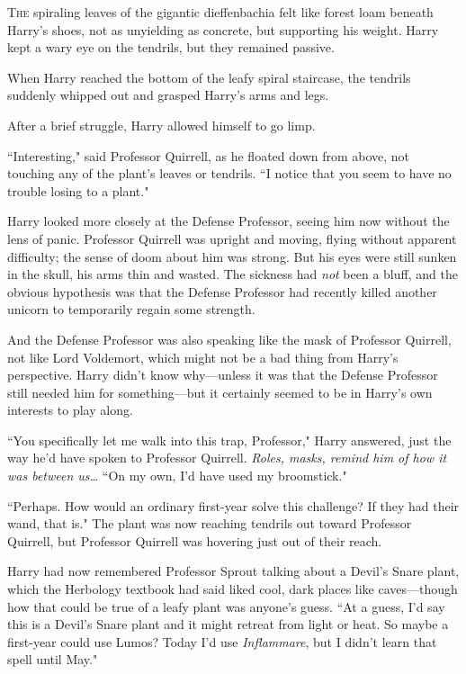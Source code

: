 
\lettrine{T}{he} spiraling leaves of the gigantic dieffenbachia felt like forest loam beneath Harry's shoes, not as unyielding as concrete, but supporting his weight. Harry kept a wary eye on the tendrils, but they remained passive.

When Harry reached the bottom of the leafy spiral staircase, the tendrils suddenly whipped out and grasped Harry's arms and legs.

After a brief struggle, Harry allowed himself to go limp.

``Interesting," said Professor Quirrell, as he floated down from above, not touching any of the plant's leaves or tendrils. ``I notice that you seem to have no trouble losing to a plant."

Harry looked more closely at the Defense Professor, seeing him now without the lens of panic. Professor Quirrell was upright and moving, flying without apparent difficulty; the sense of doom about him was strong. But his eyes were still sunken in the skull, his arms thin and wasted. The sickness had \emph{not} been a bluff, and the obvious hypothesis was that the Defense Professor had recently killed another unicorn to temporarily regain some strength.

And the Defense Professor was also speaking like the mask of Professor Quirrell, not like Lord Voldemort, which might not be a bad thing from Harry's perspective. Harry didn't know why—unless it was that the Defense Professor still needed him for something—but it certainly seemed to be in Harry's own interests to play along.

``You specifically let me walk into this trap, Professor," Harry answered, just the way he'd have spoken to Professor Quirrell. \emph{Roles, masks, remind him of how it was between us{\ldots}} ``On my own, I'd have used my broomstick."

``Perhaps. How would an ordinary first-year solve this challenge? If they had their wand, that is." The plant was now reaching tendrils out toward Professor Quirrell, but Professor Quirrell was hovering just out of their reach.

Harry had now remembered Professor Sprout talking about a Devil's Snare plant, which the Herbology textbook had said liked cool, dark places like caves—though how that could be true of a leafy plant was anyone's guess. ``At a guess, I'd say this is a Devil's Snare plant and it might retreat from light or heat. So maybe a first-year could use Lumos? Today I'd use \emph{Inflammare}, but I didn't learn that spell until May."

